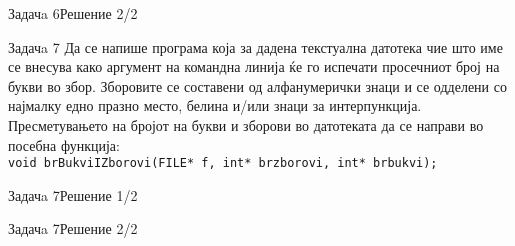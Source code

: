 \begin{frame}[fragile]{Задачa 6}{Решение 2/2}

\end{frame}

\begin{frame}{Задачa 7}
Да се напише програма која за дадена текстуална датотека чие што име се внесува
како аргумент на командна линија ќе го испечати просечниот број на  букви во
збор. Зборовите се составени од алфанумерички знаци и се одделени со најмалку
едно празно место, белина и/или знаци за интерпункција. Пресметувањето на бројот
на букви и зборови во датотеката да се направи во посебна функција:\\[.5cm]

\texttt{\scriptsize{void brBukviIZborovi(FILE* f, int* brzborovi, int*
brbukvi);}}

\end{frame}

\begin{frame}[fragile]{Задачa 7}{Решение 1/2}

\end{frame}

\begin{frame}[fragile]{Задачa 7}{Решение 2/2}

\end{frame}

